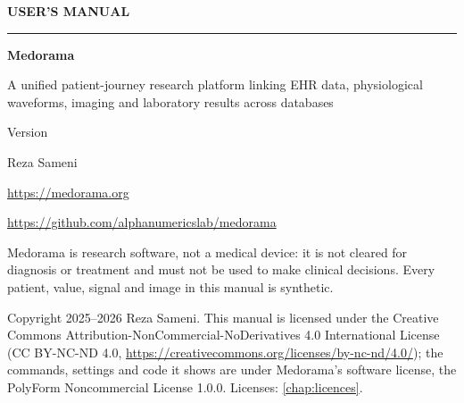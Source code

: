 \documentclass[11pt,a4paper,oneside,openany]{book}
\begin{document}
\begin{titlepage}
  \thispagestyle{empty}
  \vspace*{0.18\textheight}
  {\sffamily\color{accent}\large\bfseries USER'S MANUAL\par}
  \vspace{0.6em}
  {\color{accent}\rule{\linewidth}{1.2pt}\par}
  \vspace{1.0em}
  {\sffamily\bfseries\color{titlecolor}\fontsize{40}{44}\selectfont Medorama\par}
  \vspace{0.8em}
  {\sffamily\Large\color{titlecolor}A unified patient-journey research platform linking EHR
    data, physiological waveforms, imaging and laboratory results across databases\par}
  \vspace{2.2em}
  {\sffamily\large\color{mutedtext}Version \mdversion\quad\textbar\quad \mddate\par}
  \vfill
  {\sffamily\large\color{titlecolor}Reza Sameni\par}
  \vspace{0.3em}
  {\sffamily\small\color{mutedtext}\url{https://medorama.org}\par}
  {\sffamily\small\color{mutedtext}\url{https://github.com/alphanumericslab/medorama}\par}
  \vspace{1.2em}
  {\small\color{mutedtext}
  Medorama is research software, not a medical device: it is not cleared for diagnosis or
  treatment and must not be used to make clinical decisions. Every patient, value, signal and
  image in this manual is synthetic.\par
  \vspace{0.6em}
  Copyright \textcopyright{} 2025--2026 Reza Sameni. This manual is licensed under the Creative
  Commons Attribution-NonCommercial-NoDerivatives 4.0 International License (CC BY-NC-ND 4.0,
  \url{https://creativecommons.org/licenses/by-nc-nd/4.0/}); the commands, settings and code it
  shows are under Medorama's software license, the PolyForm Noncommercial License 1.0.0.
  Licenses: \cref{chap:licences}.\par}
\end{titlepage}

\frontmatter
\tableofcontents
\listoffigures

\mainmatter
\end{document}
